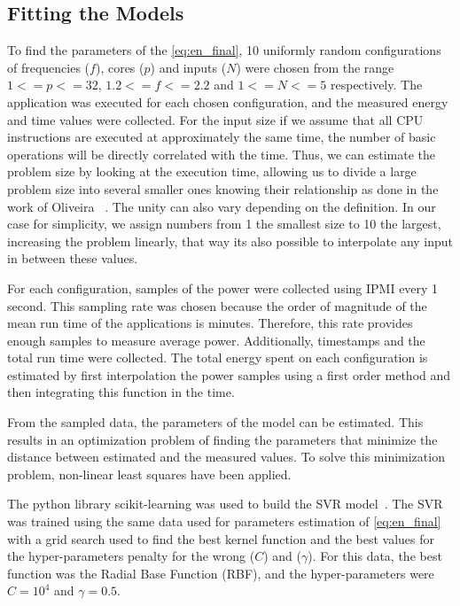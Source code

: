 \subsection{Fitting the Models} \label{sec:fitting}
To find the parameters of the \cref{eq:en_final}, 10 uniformly random configurations of frequencies ($f$), cores ($p$) and inputs ($N$) were chosen from the range $1<=p<=32$, $1.2<=f<=2.2$ and $1<=N<=5$ respectively. The application was executed for each chosen configuration, and the measured  energy and time values were collected. For the input size if we assume that all CPU instructions are executed at approximately the same time, the number of basic operations will be directly correlated with the time. Thus, we can estimate the problem size by looking at the execution time, allowing us to divide a large problem size into several smaller ones knowing their relationship as done in the work of Oliveira ~\cite{Oliveira2018ApplicationCores}. The unity can also vary depending on the definition. In our case for simplicity, we assign numbers from 1 the smallest size to 10 the largest, increasing the problem linearly, that way its also possible to interpolate any input in between these values.


For each configuration, samples of the power were collected using IPMI every 1 second. This sampling rate was chosen because the order of magnitude of the mean run time of the applications is minutes. Therefore, this rate provides enough samples to measure average power. Additionally, timestamps and the total run time were collected. The total energy spent on each configuration is estimated by first interpolation the power samples using a first order method and then integrating this function in the time.

From the sampled data, the parameters of the model can be estimated. This results in an optimization problem of finding the parameters that minimize the distance between estimated and the measured values. To solve this minimization problem, non-linear least squares have been applied. 

The python library scikit-learning was used to build the SVR model~\cite{PedregosaFandVaroquauxGandGramfortAandMichel2011Scikit-learn:Python}. The SVR was trained using the same data used for parameters estimation of \cref{eq:en_final} with a grid search used to find the best kernel function and the best values for the hyper-parameters penalty for the wrong ($C$) and ($\gamma$). For this data, the best function was the Radial Base Function (RBF), and the hyper-parameters were $C=10^4$ and $\gamma=0.5$. 

